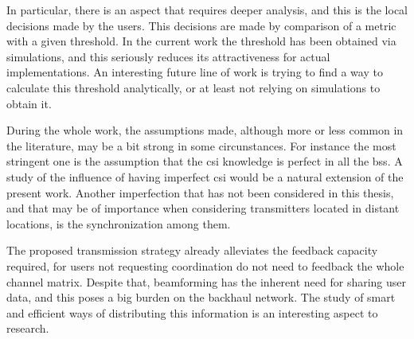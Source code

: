 In particular, there is an aspect that requires deeper analysis, and this is the
local decisions made by the users. This decisions are made by comparison of a
metric with a given threshold. In the current work the threshold has been
obtained via simulations, and this seriously reduces its attractiveness for
actual implementations. An interesting future line of work is trying to find a
way to calculate this threshold analytically, or at least not relying on
simulations to obtain it.

During the whole work, the assumptions made, although more or less common in the
literature, may be a bit strong in some circunstances. For instance the most
stringent one is the assumption that the \gls{csi} knowledge is perfect in all
the \glspl{bs}. A study of the influence of having imperfect \gls{csi} would be
a natural extension of the present work. Another imperfection that has not been
considered in this thesis, and that may be of importance when considering
transmitters located in distant locations, is the synchronization among them.

The proposed transmission strategy already alleviates the feedback capacity
required, for users not requesting coordination do not need to feedback the
whole channel matrix. Despite that, beamforming has the inherent need for
sharing user data, and this poses a big burden on the backhaul network. The
study of smart and efficient ways of distributing this information is an
interesting aspect to research.
